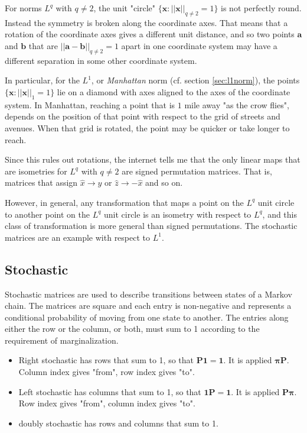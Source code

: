 For norms $L^q$ with $q\neq2$, the unit "circle" $\{\mathbf{x}: ||\mathbf{x}||_{q\neq2} = 1\}$ is not perfectly round. Instead the symmetry is broken along the coordinate axes. That means that a rotation of the coordinate axes gives a different unit distance, and so two points $\mathbf{a}$ and $\mathbf{b}$ that are $||\mathbf{a}-\mathbf{b}||_{q\neq2} = 1$ apart in one coordinate system may have a different separation in some other coordinate system. 

In particular, for the $L^1$, or \textit{Manhattan} norm (cf. section \ref{sec:l1norm}), the points $\{\mathbf{x}: ||\mathbf{x}||_{1} = 1\}$ lie on a diamond with axes aligned to the axes of the coordinate system. In Manhattan, reaching a point that is $1$ mile away "as the crow flies", depends on the position of that point with respect to the grid of streets and avenues. When that grid is rotated, the point may be quicker or take longer to reach. 

Since this rules out rotations, the internet tells me that the only linear maps that are isometries for $L^q$ with $q\neq 2$ are signed permutation matrices. That is, matrices that assign $\hat{x}\rightarrow \hat{y}$ or $\hat{z} \rightarrow -\hat{x}$ and so on. 

However, in general, any transformation that maps a point on the $L^q$ unit circle to another point on the $L^q$ unit circle is an isometry with respect to $L^q$, and this class of transformation is more general than signed permutations. The stochastic matrices are an example with respect to $L^1$.

\subsection{Stochastic}

Stochastic matrices are used to describe transitions between states of a Markov chain. The matrices are square and each entry is non-negative and represents a conditional probability of moving from one state to another. The entries along either the row or the column, or both, must sum to 1 according to the requirement of marginalization.

\begin{itemize}
\item Right stochastic has rows that sum to 1, so that $\mathbf{P}\mathbf{1}=\mathbf{1}$. It is applied $\mathbf{\pi}\mathbf{P}$. Column index gives "from", row index gives "to". 
\item Left stochastic has columns that sum to 1, so that $\mathbf{1}\mathbf{P}=\mathbf{1}$. It is applied $\mathbf{P}\mathbf{\pi}$. Row index gives "from", column index gives "to".
\item doubly stochastic has rows and columns that sum to 1. 
\end{itemize}

